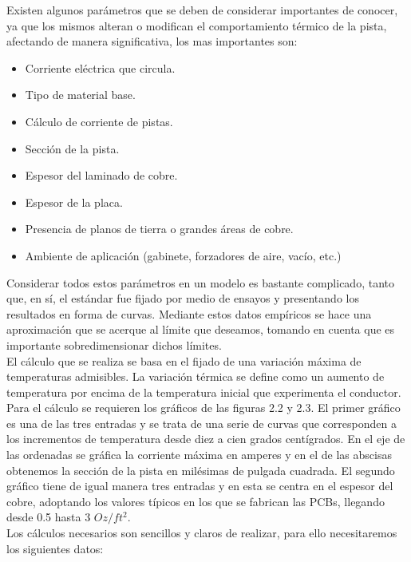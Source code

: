 Existen algunos parámetros que se deben de considerar importantes de conocer, ya que los mismos alteran o modifican el comportamiento térmico de la pista, afectando de manera significativa, los mas importantes son:\\

\begin{itemize}
\item Corriente eléctrica que circula.
\item Tipo de material base.
\item Cálculo de corriente de pistas.
\item Sección de la pista.
\item Espesor del laminado de cobre.
\item Espesor de la placa.
\item Presencia de planos de tierra o grandes áreas de cobre.
\item Ambiente de aplicación (gabinete, forzadores de aire, vacío, etc.)
\end{itemize}

Considerar todos estos parámetros en un modelo es bastante complicado, tanto que, en sí, el estándar fue fijado por medio de ensayos y presentando los resultados en forma de curvas. Mediante estos datos empíricos se hace una aproximación que se acerque al límite que deseamos, tomando en cuenta que es importante sobredimensionar dichos límites. \\

El cálculo que se realiza se basa en el fijado de una variación máxima de temperaturas admisibles. La variación térmica se define como un aumento de temperatura por encima de la temperatura inicial que experimenta el conductor. \\
Para el cálculo se requieren los gráficos de las figuras 2.2 y 2.3. El primer gráfico es una de las tres entradas y se trata de una serie de curvas que corresponden a los incrementos de temperatura desde diez a cien grados centígrados. En el eje de las ordenadas se gráfica la corriente máxima en amperes y en el de las abscisas obtenemos la sección de la pista en milésimas de pulgada cuadrada. El segundo gráfico tiene de igual manera tres entradas y en esta se centra en el espesor del cobre, adoptando los valores típicos en los que se fabrican las PCBs, llegando desde 0.5 hasta 3 $Oz/ft^{2}$.\\

Los cálculos necesarios son sencillos y claros de realizar, para ello necesitaremos los siguientes datos:\\

